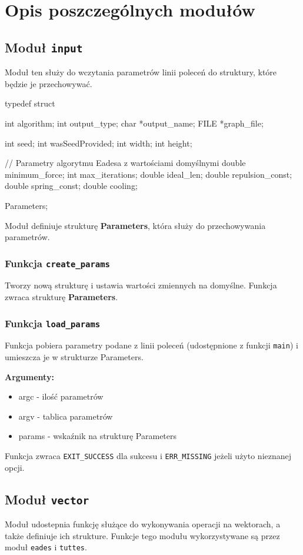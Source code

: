 \documentclass[]{article}
\begin{document}
\section{Opis poszczególnych modułów}

\subsection{Moduł \texttt{input}}
Moduł ten służy do wczytania parametrów linii poleceń do struktury, które będzie je przechowywać.

\begin{mylisting}
typedef struct {
    int algorithm;
    int output_type;
    char *output_name;
    FILE *graph_file;

    int seed;
    int wasSeedProvided;
    int width;
    int height;

    // Parametry algorytmu Eadesa z wartościami domyślnymi
    double minimum_force;
    int max_iterations;
    double ideal_len;
    double repulsion_const;
    double spring_const;
    double cooling;
} Parameters;
\end{mylisting}
Moduł definiuje strukturę \textbf{Parameters}, która służy do przechowywania parametrów.

\subsubsection{Funkcja \texttt{create\_params}}
Tworzy nową strukturę i ustawia wartości zmiennych na domyślne. Funkcja zwraca strukturę \textbf{Parameters}.

\subsubsection{Funkcja \texttt{load\_params}}
Funkcja pobiera parametry podane z linii poleceń (udostępnione z funkcji \texttt{main}) i umieszcza je w strukturze
Parameters.

\textbf{Argumenty:}
\begin{itemize}
    \item argc - ilość parametrów
    \item argv - tablica parametrów
    \item params - wskaźnik na strukturę Parameters
\end{itemize}
Funkcja zwraca \texttt{EXIT\_SUCCESS} dla sukcesu i \texttt{ERR\_MISSING} jeżeli użyto nieznanej opcji.

\subsection{Moduł \texttt{vector}}
Moduł udostepnia funkcję służące do wykonywania operacji na wektorach, a także definiuje ich strukture. Funkcje tego
modułu wykorzystywane są przez moduł \texttt{eades} i \texttt{tuttes}.
\end{document}

